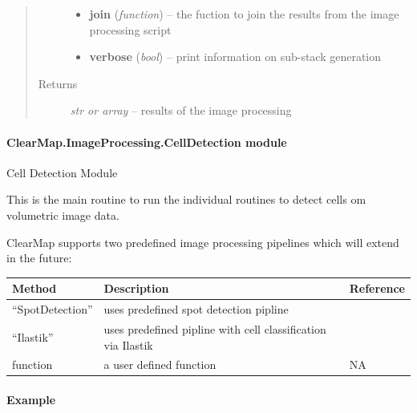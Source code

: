 \documentclass[letterpaper,10pt,english]{sphinxmanual}
\begin{document}
\begin{fulllineitems}
\begin{quote}
\begin{description}
\begin{itemize}
\item {} 
\textbf{join} (\emph{function}) --
the fuction to join the results from the image processing script

\item {} 
\textbf{verbose} (\emph{bool}) --
print information on sub-stack generation

\end{itemize}

\item[{Returns}] \leavevmode
\emph{str or array} --
results of the image processing

\end{description}\end{quote}

\end{fulllineitems}



\paragraph{ClearMap.ImageProcessing.CellDetection module}
\label{api/ClearMap.ImageProcessing:module-ClearMap.ImageProcessing.CellDetection}\label{api/ClearMap.ImageProcessing:clearmap-imageprocessing-celldetection-module}
Cell Detection Module

This is the main routine to run the individual routines to detect cells om
volumetric image data.

ClearMap supports two predefined image processing pipelines which will extend
in the future:

\begin{tabulary}{\linewidth}{|L|L|L|}
\hline
\textsf{\relax 
Method
} & \textsf{\relax 
Description
} & \textsf{\relax 
Reference
}\\
\hline
``SpotDetection''
 & 
uses predefined spot detection pipline
 & 
{\hyperref[api/ClearMap.ImageProcessing:ClearMap.ImageProcessing.CellDetection.detectCells]{\emph{}}}
\\
\hline
``Ilastik''
 & 
uses predefined pipline with cell classification via Ilastik
 & 
\\
\hline
function
 & 
a user defined function
 & 
NA
\\
\hline\end{tabulary}

\paragraph{Example}
\end{document}
